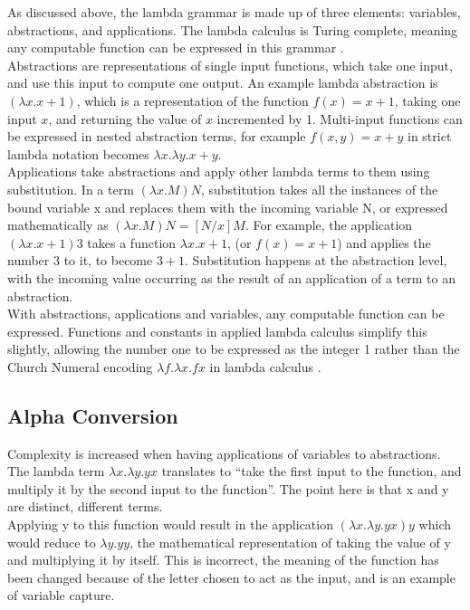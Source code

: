 \documentclass[a4paper,12pt]{report}
\begin{document}
As discussed above, the lambda grammar is made up of three elements: variables, abstractions, and applications. The lambda calculus is Turing complete, meaning any computable function can be expressed in this grammar \cite{Rojas1998}.\\

Abstractions are representations of single input functions, which take one input, and use this input to compute one output. An example lambda abstraction is $(\lambda x.x+1)$, which is a representation of the function $f(x) = x+1$, taking one input $x$, and returning the value of $x$ incremented by 1. Multi-input functions can be expressed in nested abstraction terms, for example $f(x,y)=x+y$ in strict lambda notation becomes $\lambda x.\lambda y.x+y$.\\

Applications take abstractions and apply other lambda terms to them using substitution. In a term $(\lambda x.M)N$, substitution takes all the instances of the bound variable x and replaces them with the incoming variable N, or expressed mathematically as $(\lambda x.M)N=[N / x]M$.  For example, the application $(\lambda x.x+1)3$ takes a function $\lambda x.x+1$, (or $f(x)=x+1$) and applies the number 3 to it, to become $3+1$. Substitution happens at the abstraction level, with the incoming value occurring as the result of an application of a term to an abstraction.\\

With abstractions, applications and variables, any computable function can be expressed. Functions and constants in applied lambda calculus simplify this slightly, allowing the number one to be expressed as the integer 1 rather than the Church Numeral encoding $\lambda f.\lambda x.fx$ in lambda calculus \cite{Tarau2017}.

\subsection{Alpha Conversion}

Complexity is increased when having applications of variables to abstractions. The lambda term $\lambda x.\lambda y.yx$ translates to “take the first input to the function, and multiply it by the second input to the function”. The point here is that x and y are distinct, different terms.\\

Applying y to this function would result in the application $(\lambda x.\lambda y.yx)y$ which would reduce to $\lambda y.yy$, the mathematical representation of taking the value of y and multiplying it by itself. This is incorrect, the meaning of the function has been changed because of the letter chosen to act as the input, and is an example of variable capture.\\
\end{document}
